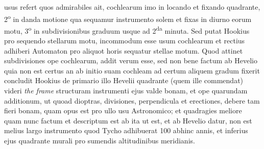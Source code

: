 \pstart {} usus refert quos admirabiles ait, cochlearum imo in locando et fixando quadrante\protect{}, 2\textsuperscript{o} in danda motione qua sequamur instrumento solem et fixas in diurno eorum motu, 3\textsuperscript{o} in subdivisionibus graduum usque ad 2\textsuperscript{da} minuta. Sed putat Hookius\protect{} pro sequendo stellarum motu, incommodum esse usum cochlearum et rectius adhiberi Automaton\protect{}  pro aliquot horis sequatur stellae motum. Quod attinet subdivisiones ope cochlearum, addit  verum esse, sed non bene factum ab Hevelio\protect{} quia non est certus an ab initio suam cochleam ad certum aliquem gradum fixerit concludit Hookius\protect{} de primario illo Hevelii\protect{} quadrante\protect{} (quem ille  commendat) videri \textit{the frame} structuram instrumenti ejus valde bonam, et ope quarundam additionum, ut quoad dioptras\protect{}, divisiones, perpendicula et erectiones, debere tam fieri bonam, quam opus est pro ullo usu Astronomico; et quadragies meliore quam nunc factum et descriptum est ab  ita ut est, et ab Hevelio\protect{} datur, non est melius largo instrumento quod Tycho\protect{} adhibuerat 100 abhinc annis, et inferius ejus quadrante\protect{} murali pro sumendis altitudinibus meridianis\protect{}. 
